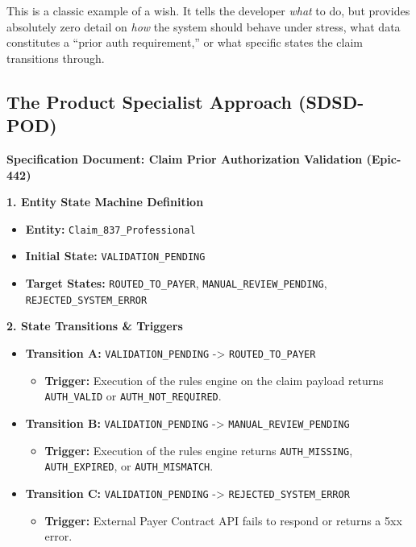 This is a classic example of a wish. It tells the developer \emph{what}
to do, but provides absolutely zero detail on \emph{how} the system
should behave under stress, what data constitutes a ``prior auth
requirement,'' or what specific states the claim transitions through.

\subsection{The Product Specialist Approach
(SDSD-POD)}\label{the-product-specialist-approach-sdsd-pod}

\textbf{Specification Document: Claim Prior Authorization Validation
(Epic-442)}

\textbf{1. Entity State Machine Definition}

\begin{itemize}
\tightlist
\item
  \textbf{Entity:} \texttt{Claim\_837\_Professional}
\item
  \textbf{Initial State:} \texttt{VALIDATION\_PENDING}
\item
  \textbf{Target States:} \texttt{ROUTED\_TO\_PAYER},
  \texttt{MANUAL\_REVIEW\_PENDING}, \texttt{REJECTED\_SYSTEM\_ERROR}
\end{itemize}

\textbf{2. State Transitions \& Triggers}

\begin{itemize}
\tightlist
\item
  \textbf{Transition A:} \texttt{VALIDATION\_PENDING} -\textgreater{}
  \texttt{ROUTED\_TO\_PAYER}

  \begin{itemize}
  \tightlist
  \item
    \textbf{Trigger:} Execution of the rules engine on the claim payload
    returns \texttt{AUTH\_VALID} or \texttt{AUTH\_NOT\_REQUIRED}.
  \end{itemize}
\item
  \textbf{Transition B:} \texttt{VALIDATION\_PENDING} -\textgreater{}
  \texttt{MANUAL\_REVIEW\_PENDING}

  \begin{itemize}
  \tightlist
  \item
    \textbf{Trigger:} Execution of the rules engine returns
    \texttt{AUTH\_MISSING}, \texttt{AUTH\_EXPIRED}, or
    \texttt{AUTH\_MISMATCH}.
  \end{itemize}
\item
  \textbf{Transition C:} \texttt{VALIDATION\_PENDING} -\textgreater{}
  \texttt{REJECTED\_SYSTEM\_ERROR}

  \begin{itemize}
  \tightlist
  \item
    \textbf{Trigger:} External Payer Contract API fails to respond or
    returns a 5xx error.
  \end{itemize}
\end{itemize}

